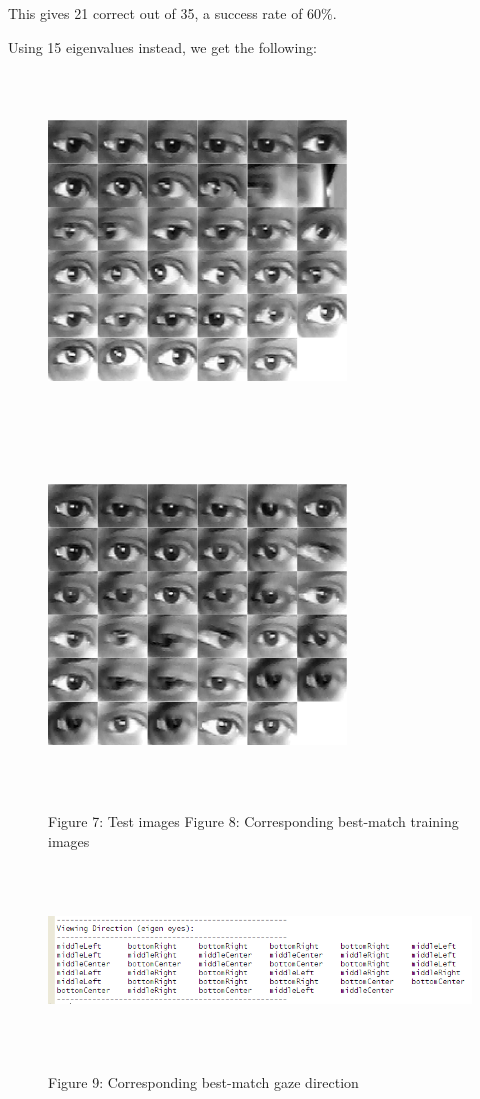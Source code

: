 \documentclass[12pt,letterpaper]{article}
\begin{document}
This gives 21 correct out of 35, a success rate of 60\%.

\newpage

Using 15 eigenvalues instead, we get the following:

\begin{figure}[h]
\includegraphics[width=79mm,height=95mm]{testImg2.png}
\hfill
\includegraphics[width=79mm,height=95mm]{matchImg2.png}

\small \quad\qquad\qquad\qquad\qquad Figure 7: Test images \qquad\qquad\qquad
\small Figure 8: Corresponding best-match training images
\end{figure}

\begin{figure}[h]
\centering
\includegraphics[width=170mm,height=50mm]{viewingDir2.png}

\small Figure 9: Corresponding best-match gaze direction
\end{figure}
\end{document}
